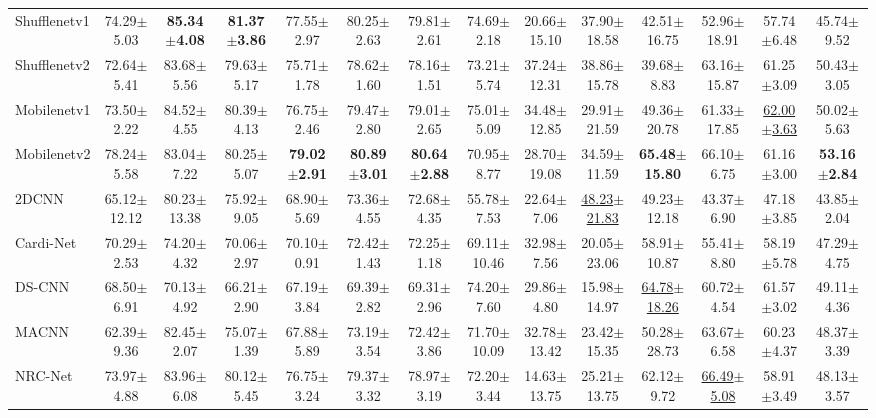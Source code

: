 \begin{table}[!t]
{{\begin{tabular}{lcccccc|ccccccc}
\midrule
Shufflenetv1 & 74.29$\pm$5.03 & \textbf{85.34$\pm$4.08} & \textbf{81.37$\pm$3.86} & 77.55$\pm$2.97 & 80.25$\pm$2.63 & 79.81$\pm$2.61 & 74.69$\pm$2.18 & 20.66$\pm$15.10 & 37.90$\pm$18.58 & 42.51$\pm$16.75 & 52.96$\pm$18.91 & 57.74$\pm$6.48 & 45.74$\pm$9.52 \\
Shufflenetv2 & 72.64$\pm$5.41 & 83.68$\pm$5.56 & 79.63$\pm$5.17 & 75.71$\pm$1.78 & 78.62$\pm$1.60 & 78.16$\pm$1.51 & 73.21$\pm$5.74 & 37.24$\pm$12.31 & 38.86$\pm$15.78 & 39.68$\pm$8.83 & 63.16$\pm$15.87 & 61.25$\pm$3.09 & 50.43$\pm$3.05 \\
Mobilenetv1 & 73.50$\pm$2.22 & 84.52$\pm$4.55 & 80.39$\pm$4.13 & 76.75$\pm$2.46 & 79.47$\pm$2.80 & 79.01$\pm$2.65 & 75.01$\pm$5.09 & 34.48$\pm$12.85 & 29.91$\pm$21.59 & 49.36$\pm$20.78 & 61.33$\pm$17.85 & \underline{62.00$\pm$3.63} & 50.02$\pm$5.63 \\
Mobilenetv2 & 78.24$\pm$5.58 & 83.04$\pm$7.22 & 80.25$\pm$5.07 & \textbf{79.02$\pm$2.91} & \textbf{80.89$\pm$3.01} & \textbf{80.64$\pm$2.88} & 70.95$\pm$8.77 & 28.70$\pm$19.08 & 34.59$\pm$11.59 & \textbf{65.48$\pm$15.80} & 66.10$\pm$6.75 & 61.16$\pm$3.00 & \textbf{53.16$\pm$2.84} \\
\midrule
2DCNN~\cite{2DCNN} & 65.12$\pm$12.12 & 80.23$\pm$13.38 & 75.92$\pm$9.05 & 68.90$\pm$5.69 & 73.36$\pm$4.55 & 72.68$\pm$4.35 & 55.78$\pm$7.53 & 22.64$\pm$7.06 & \underline{48.23$\pm$21.83} & 49.23$\pm$12.18 & 43.37$\pm$6.90 & 47.18$\pm$3.85 & 43.85$\pm$2.04 \\
Cardi-Net~\cite{Cardi-Net} & 70.29$\pm$2.53 & 74.20$\pm$4.32 & 70.06$\pm$2.97 & 70.10$\pm$0.91 & 72.42$\pm$1.43 & 72.25$\pm$1.18 & 69.11$\pm$10.46 & 32.98$\pm$7.56 & 20.05$\pm$23.06 & 58.91$\pm$10.87 & 55.41$\pm$8.80 & 58.19$\pm$5.78 & 47.29$\pm$4.75 \\
DS-CNN~\cite{DS-CNN} & 68.50$\pm$6.91 & 70.13$\pm$4.92 & 66.21$\pm$2.90 & 67.19$\pm$3.84 & 69.39$\pm$2.82 & 69.31$\pm$2.96 & 74.20$\pm$7.60 & 29.86$\pm$4.80 & 15.98$\pm$14.97 & \underline{64.78$\pm$18.26} & 60.72$\pm$4.54 & 61.57$\pm$3.02 & 49.11$\pm$4.36 \\
MACNN~\cite{chen2021multi} & 62.39$\pm$9.36 & 82.45$\pm$2.07 & 75.07$\pm$1.39 & 67.88$\pm$5.89 & 73.19$\pm$3.54 & 72.42$\pm$3.86 &71.70$\pm$10.09 & 32.78$\pm$13.42 & 23.42$\pm$15.35 & 50.28$\pm$28.73 & 63.67$\pm$6.58 & 60.23$\pm$4.37 & 48.37$\pm$3.39 \\
NRC-Net~\cite{NRC-Net} & 73.97$\pm$4.88 & 83.96$\pm$6.08 & 80.12$\pm$5.45 & 76.75$\pm$3.24 & 79.37$\pm$3.32 & 78.97$\pm$3.19 & 72.20$\pm$3.44 & 14.63$\pm$13.75 & 25.21$\pm$13.75 & 62.12$\pm$9.72 & \underline{66.49$\pm$5.08} & 58.91$\pm$3.49 & 48.13$\pm$3.57 \\

\end{tabular}}}
\end{table}
